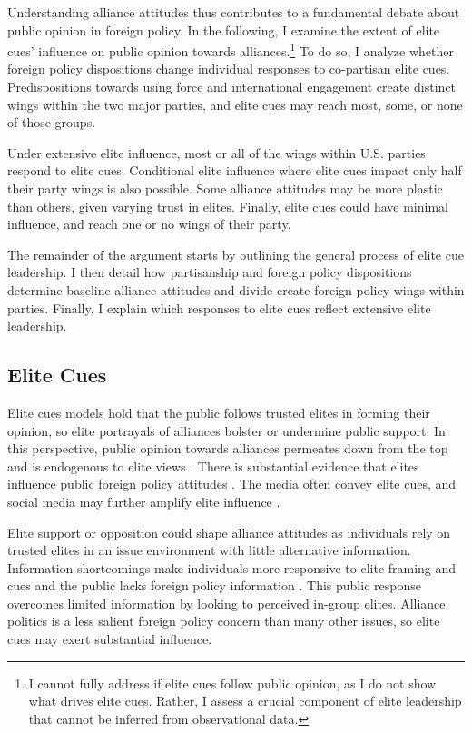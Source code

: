 \documentclass[12pt]{article}
\begin{document}
Understanding alliance attitudes thus contributes to a fundamental debate about public opinion in foreign policy. 
In the following, I examine the extent of elite cues' influence on public opinion towards alliances.\footnote{I cannot fully address if elite cues follow public opinion, as I do not show what drives elite cues. Rather, I assess a crucial component of elite leadership that cannot be inferred from observational data.}
To do so, I analyze whether foreign policy dispositions change individual responses to co-partisan elite cues.
Predispositions towards using force and international engagement create distinct wings within the two major parties, and elite cues may reach most, some, or none of those groups.


Under extensive elite influence, most or all of the wings within U.S. parties respond to elite cues. 
Conditional elite influence where elite cues impact only half their party wings is also possible. 
Some alliance attitudes may be more plastic than others, given varying trust in elites. 
Finally, elite cues could have minimal influence, and reach one or no wings of their party.


The remainder of the argument starts by outlining the general process of elite cue leadership.
I then detail how partisanship and foreign policy dispositions determine baseline alliance attitudes and divide create foreign policy wings within parties.
Finally, I explain which responses to elite cues reflect extensive elite leadership. 


\subsection{Elite Cues} 


Elite cues models hold that the public follows trusted elites in forming their opinion, so elite portrayals of alliances bolster or undermine public support.
In this perspective, public opinion towards alliances permeates down from the top and is endogenous to elite views \citep{Druckman2014}.
There is substantial evidence that elites influence public foreign policy attitudes \citep{BaumPotter2008}. 
The media often convey elite cues, and social media may further amplify elite influence \citep{BaumPotter2019}.   


Elite support or opposition could shape alliance attitudes as individuals rely on trusted elites in an issue environment with little alternative information. 
Information shortcomings make individuals more responsive to elite framing and cues \citep{Druckman2001, Peterson2017} and the public lacks foreign policy information \citep{BaumPotter2008}.
This public response overcomes limited information by looking to perceived in-group elites. 
Alliance politics is a less salient foreign policy concern than many other issues, so elite cues may exert substantial influence.
\end{document}
